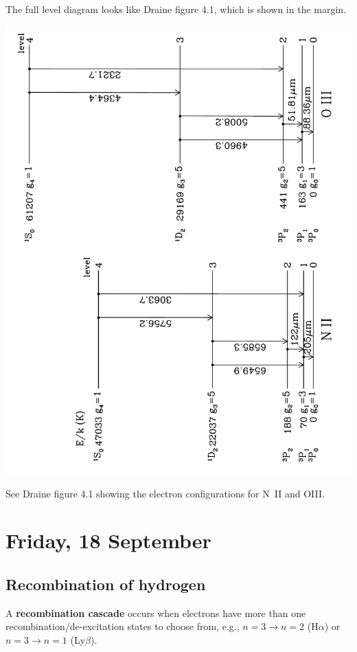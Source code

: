 \documentclass{tufte-handout}
\renewcommand{\textbf}[1]{{\bf \textcolor{dark-gray}{#1}}}
\renewcommand{\smallcaps}[1]{{\smaller~\textsc{#1}}}
\begin{document}
The full level diagram looks like Draine figure 4.1, which is shown in the margin.
\begin{marginfigure}
\includegraphics[width=\columnwidth, angle=-90]{ism_figures/Draine-4_1}
\caption{See Draine figure 4.1 showing the electron configurations for N\smallcaps{II} and O\small{III}.}
\label{fig:regimes of absorption line systems}
\end{marginfigure}


\section{Friday, 18 September}
\subsection{Recombination of hydrogen}

A \textbf{recombination cascade} occurs when electrons have more than one recombination/de-excitation states to choose from, e.g., $n=3 \rightarrow n=2$ (H$\alpha$) or $n=3\rightarrow n=1$ (Ly$\beta$).
\end{document}
